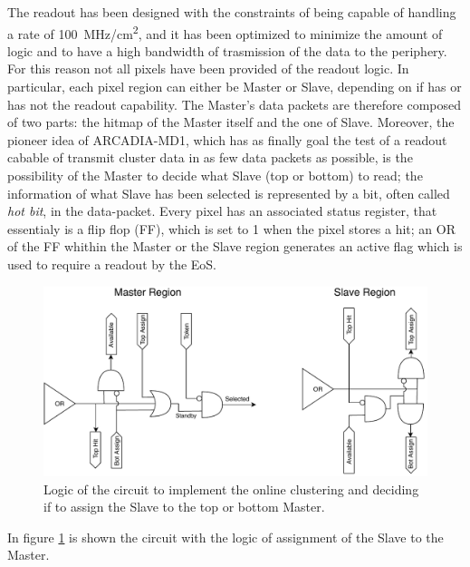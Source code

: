         The readout has been designed with the constraints of being capable of handling a rate of \SI{100}{MHz/cm\squared}, and it has been optimized to minimize the amount of logic and to have a high bandwidth of trasmission of the data to the periphery. For this reason not all pixels have been provided of the readout logic.
        In particular, each pixel region can either be Master or Slave, depending on if has or has not the readout capability. 
        The Master's data packets are therefore composed of two parts: the hitmap of the Master itself and the one of Slave. 
        Moreover, the pioneer idea of ARCADIA-MD1, which has as finally goal the test of a readout cabable of transmit cluster data in as few data packets as possible, is the possibility of the Master to decide what Slave (top or bottom) to read; the information of what Slave has been selected is represented by a bit, often called \emph{hot bit}, in the data-packet.
        Every pixel has an associated status register, that essentialy is a flip flop (FF), which is set to 1 when the pixel stores a hit; an OR of the FF whithin the Master or the Slave region generates an active flag which is used to require a readout by the EoS.  
        \begin{figure}[h!]
            \centering
            \includegraphics[width=.95\linewidth]{figures/ARCADIA/clustering_logic.pdf}
            \caption{Logic of the circuit to implement the online clustering and deciding if to assign the Slave to the top or bottom Master.}
            \label{fig:clustering_logic}
        \end{figure}
        In figure \ref{fig:clustering_logic} is shown the circuit with the logic of assignment of the Slave to the Master.
        

